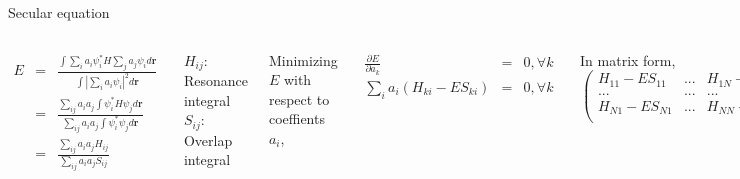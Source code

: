 \documentclass[aspectratio=169]{beamer}
\let \vec \mathbf
\begin{document}
    \begin{frame}{Secular equation}

        \begin{columns}
            \begin{eqnarray*}
                E & = &\frac{\int \sum_i a_i \psi_i^* H \sum_j a_j \psi_i d\vec{r}}{\int |\sum_i a_i \psi_i|^2 d\vec{r}}\\
                & = &\frac{\sum_{ij} a_i a_j \int \psi_i^* H \psi_j d\vec{r}}{\sum_{ij} a_i a_j \int \psi_i^* \psi_j d\vec{r}}\\
                & = &\frac{\sum_{ij} a_i a_j H_{ij}}{\sum_{ij} a_i a_j S_{ij} }\\
            \end{eqnarray*}

            $H_{ij}$: Resonance integral\\
            $S_{ij}$: Overlap integral


            Minimizing $E$ with respect to coeffients $a_i$,

            \begin{eqnarray*}
                \frac{\partial E}{\partial a_k} & = & 0, \forall k \\
                \sum_i a_i (H_{ki} - E S_{ki}) & = & 0, \forall k
            \end{eqnarray*}

            In matrix form,
            \begin{equation*}
                \begin{pmatrix}
                    H_{11}-ES_{11} & ... & H_{1N}-ES_{1N} \\
                    ...            & ... & ...            \\
                    H_{N1}-ES_{N1} & ... & H_{NN}-ES_{NN} \\
                \end{pmatrix}
                \begin{pmatrix}
                    a_1 \\
                    ... \\
                    a_N \\
                \end{pmatrix}
                = 0
            \end{equation*}
        \end{columns}
    \end{frame}
\end{document}
